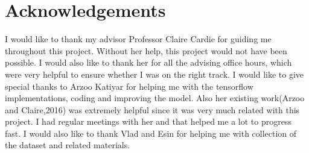 \documentclass[11pt]{article}
\begin{document}
\section*{Acknowledgements}
I would like to thank my advisor Professor Claire Cardie for guiding me throughout this project.
Without her help, this project would not have been possible. I would also like to thank her for 
all the advising office hours, which were very helpful to ensure whether I was on the right track.
I would like to give special thanks to Arzoo Katiyar for helping me with the tensorflow implementations, coding and
improving the model. Also her existing work(Arzoo and Claire,2016) was extremely helpful since it was very much
related with this project. I had regular meetings with her and that helped me a lot to progress fast.
I would also like to thank Vlad and Esin for helping me with collection of the dataset and related materials.

%
%
\end{document}
